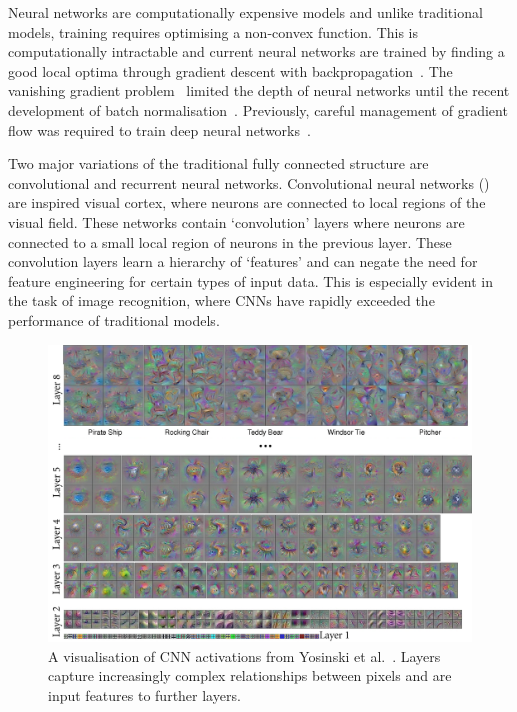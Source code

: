 \documentclass[12pt, twoside]{book}
\renewcommand\emph[1]{\textit{\color{USred}{#1}}}
\begin{document}
Neural networks are computationally expensive models and unlike traditional models, training requires optimising a non-convex function. This is computationally intractable and current neural networks are trained by finding a good local optima through gradient descent with backpropagation~\cite{convexopt}. The vanishing gradient problem~\cite{vanishinggradient} limited the depth of neural networks until the recent development of batch normalisation~\cite{batchnorm}. Previously, careful management of gradient flow was required to train deep neural networks~\cite{googlenet}. 

Two major variations of the traditional fully connected structure are convolutional and recurrent neural networks. Convolutional neural networks (\emph{CNNs}) are inspired visual cortex, where neurons are connected to local regions of the visual field. These networks contain `convolution' layers where neurons are connected to a small local region of neurons in the previous layer. These convolution layers learn a hierarchy of `features' and can negate the need for feature engineering for certain types of input data. This is especially evident in the task of image recognition, where CNNs have rapidly exceeded the performance of traditional models.


\begin{figure}[h]
	\centering\includegraphics[width=1\linewidth]{cnnvis.png}
	\caption{A visualisation of CNN activations from Yosinski et al.~\cite{cnnvis}. Layers capture increasingly complex relationships between pixels and are input features to further layers. }
	\label{cnnvis}
\end{figure}
\end{document}
